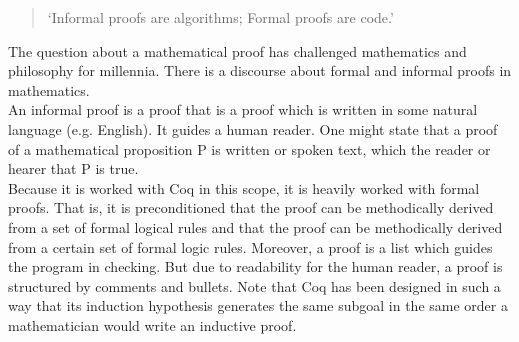 \begin{quote}
`Informal proofs are algorithms; Formal proofs are code.'
\end{quote}
The question about a mathematical proof has challenged mathematics and philosophy for millennia.
There is a discourse about formal and informal proofs in mathematics. \\
An informal proof is a proof that is a proof which is written in some natural language (e.g. English).
It guides a human reader. 
One might state that a proof of a mathematical proposition P is written or spoken  text, which  the reader or hearer that P is true.\\ 
Because it is worked with Coq in this scope, it is heavily worked with formal proofs.
That is, it is preconditioned that the proof can be methodically derived from a set of formal logical rules and that the proof can be methodically derived from a certain set of formal logic rules.
Moreover, a proof is a list which guides the program in checking. 
But due to readability for the human reader, a proof is structured by comments and bullets.
Note that Coq has been designed in such a way that its induction hypothesis generates the same subgoal in the same order a mathematician would write an inductive proof.                                                                                            









